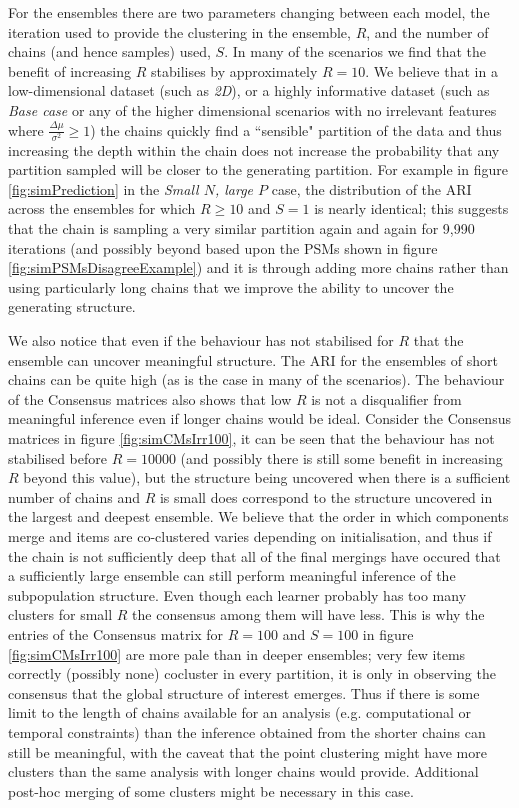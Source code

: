 \documentclass[]{article}
\begin{document}
For the ensembles there are two parameters changing between each model, the iteration used to provide the clustering in the ensemble, $R$, and the number of chains (and hence samples) used, $S$. In many of the scenarios we find that the benefit of increasing $R$ stabilises by approximately $R = 10$. We believe that in a low-dimensional dataset (such as \emph{2D}), or a highly informative dataset (such as \emph{Base case} or any of the higher dimensional scenarios with no irrelevant features where $\frac{\Delta \mu}{\sigma^2} \geq 1$) the chains quickly find a ``sensible" partition of the data and thus increasing the depth within the chain does not increase the probability that any partition sampled will be closer to the generating partition. For example in figure \ref{fig:simPrediction} in the \emph{Small $N$, large $P$} case, the distribution of the ARI across the ensembles for which $R\geq10$ and $S=1$ is nearly identical; this suggests that the chain is sampling a very similar partition again and again for 9,990 iterations (and possibly beyond based upon the PSMs shown in figure \ref{fig:simPSMsDisagreeExample}) and it is through adding more chains rather than using particularly long chains that we improve the ability to uncover the generating structure. 

We also notice that even if the behaviour has not stabilised for $R$ that the ensemble can uncover meaningful structure. The ARI for the ensembles of short chains can be quite high (as is the case in many of the scenarios). The behaviour of the Consensus matrices also shows that low $R$ is not a disqualifier from meaningful inference even if longer chains would be ideal. Consider the Consensus matrices in figure \ref{fig:simCMsIrr100}, it can be seen that the behaviour has not stabilised before $R=10000$ (and possibly there is still some benefit in increasing $R$ beyond this value), but the structure being uncovered when there is a sufficient number of chains and $R$ is small does correspond to the structure uncovered in the largest and deepest ensemble. We believe that the order in which components merge and items are co-clustered varies depending on initialisation, and thus if the chain is not sufficiently deep that all of the final mergings have occured that a sufficiently large ensemble can still perform meaningful inference of the subpopulation structure. Even though each learner probably has too many clusters for small $R$ the consensus among them will have less. This is why the entries of the Consensus matrix for $R=100$ and $S=100$ in figure \ref{fig:simCMsIrr100} are more pale than in deeper ensembles; very few items correctly (possibly none) cocluster in every partition, it is only in observing the consensus that the global structure of interest emerges. Thus if there is some limit to the length of chains available for an analysis (e.g. computational or temporal constraints) than the inference obtained from the shorter chains can still be meaningful, with the caveat that the point clustering might have more clusters than the same analysis with longer chains would provide. Additional post-hoc merging of some clusters might be necessary in this case.
\end{document}
